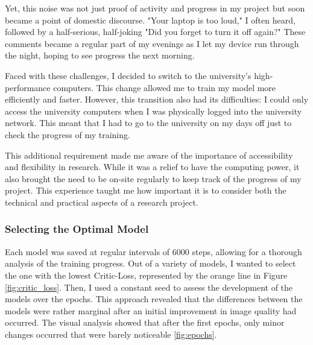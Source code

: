 \documentclass[a4paper, 12pt]{article}
\begin{document}
Yet, this noise was not just proof of activity and progress in my project but soon became a point of domestic discourse. "Your laptop is too loud," I often heard, followed by a half-serious, half-joking "Did you forget to turn it off again?" These comments became a regular part of my evenings as I let my device run through the night, hoping to see progress the next morning.

Faced with these challenges, I decided to switch to the university's high-performance computers. This change allowed me to train my model more efficiently and faster. However, this transition also had its difficulties: I could only access the university computers when I was physically logged into the university network. This meant that I had to go to the university on my days off just to check the progress of my training.

This additional requirement made me aware of the importance of accessibility and flexibility in research. While it was a relief to have the computing power, it also brought the need to be on-site regularly to keep track of the progress of my project. This experience taught me how important it is to consider both the technical and practical aspects of a research project.

\subsubsection{Selecting the Optimal Model}
Each model was saved at regular intervals of 6000 steps, allowing for a thorough analysis of the training progress. Out of a variety of models, I wanted to select the one with the lowest Critic-Loss, represented by the orange line in Figure \ref{fig:critic_loss}. Then, I used a constant seed to assess the development of the models over the epochs. This approach revealed that the differences between the models were rather marginal after an initial improvement in image quality had occurred. The visual analysis showed that after the first epochs, only minor changes occurred that were barely noticeable \ref{fig:epochs}.
\end{document}
